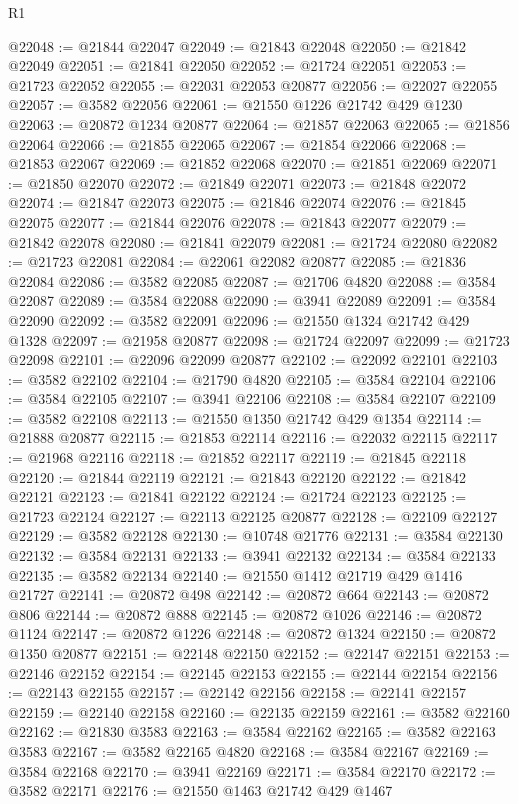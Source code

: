 \begin{lexlean}{R1}
\begin{coremodule}
@22048 := @21844 @22047
@22049 := @21843 @22048
@22050 := @21842 @22049
@22051 := @21841 @22050
@22052 := @21724 @22051
@22053 := @21723 @22052
@22055 := @22031 @22053 @20877
@22056 := @22027 @22055
@22057 := @3582 @22056
@22061 := @21550 @1226 @21742 @429 @1230
@22063 := @20872 @1234 @20877
@22064 := @21857 @22063
@22065 := @21856 @22064
@22066 := @21855 @22065
@22067 := @21854 @22066
@22068 := @21853 @22067
@22069 := @21852 @22068
@22070 := @21851 @22069
@22071 := @21850 @22070
@22072 := @21849 @22071
@22073 := @21848 @22072
@22074 := @21847 @22073
@22075 := @21846 @22074
@22076 := @21845 @22075
@22077 := @21844 @22076
@22078 := @21843 @22077
@22079 := @21842 @22078
@22080 := @21841 @22079
@22081 := @21724 @22080
@22082 := @21723 @22081
@22084 := @22061 @22082 @20877
@22085 := @21836 @22084
@22086 := @3582 @22085
@22087 := @21706 @4820
@22088 := @3584 @22087
@22089 := @3584 @22088
@22090 := @3941 @22089
@22091 := @3584 @22090
@22092 := @3582 @22091
@22096 := @21550 @1324 @21742 @429 @1328
@22097 := @21958 @20877
@22098 := @21724 @22097
@22099 := @21723 @22098
@22101 := @22096 @22099 @20877
@22102 := @22092 @22101
@22103 := @3582 @22102
@22104 := @21790 @4820
@22105 := @3584 @22104
@22106 := @3584 @22105
@22107 := @3941 @22106
@22108 := @3584 @22107
@22109 := @3582 @22108
@22113 := @21550 @1350 @21742 @429 @1354
@22114 := @21888 @20877
@22115 := @21853 @22114
@22116 := @22032 @22115
@22117 := @21968 @22116
@22118 := @21852 @22117
@22119 := @21845 @22118
@22120 := @21844 @22119
@22121 := @21843 @22120
@22122 := @21842 @22121
@22123 := @21841 @22122
@22124 := @21724 @22123
@22125 := @21723 @22124
@22127 := @22113 @22125 @20877
@22128 := @22109 @22127
@22129 := @3582 @22128
@22130 := @10748 @21776
@22131 := @3584 @22130
@22132 := @3584 @22131
@22133 := @3941 @22132
@22134 := @3584 @22133
@22135 := @3582 @22134
@22140 := @21550 @1412 @21719 @429 @1416 @21727
@22141 := @20872 @498
@22142 := @20872 @664
@22143 := @20872 @806
@22144 := @20872 @888
@22145 := @20872 @1026
@22146 := @20872 @1124
@22147 := @20872 @1226
@22148 := @20872 @1324
@22150 := @20872 @1350 @20877
@22151 := @22148 @22150
@22152 := @22147 @22151
@22153 := @22146 @22152
@22154 := @22145 @22153
@22155 := @22144 @22154
@22156 := @22143 @22155
@22157 := @22142 @22156
@22158 := @22141 @22157
@22159 := @22140 @22158
@22160 := @22135 @22159
@22161 := @3582 @22160
@22162 := @21830 @3583
@22163 := @3584 @22162
@22165 := @3582 @22163 @3583
@22167 := @3582 @22165 @4820
@22168 := @3584 @22167
@22169 := @3584 @22168
@22170 := @3941 @22169
@22171 := @3584 @22170
@22172 := @3582 @22171
@22176 := @21550 @1463 @21742 @429 @1467

\end{coremodule}
\end{lexlean}
